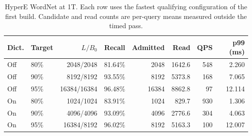 \begin{table}[htbp]
  \centering
  \caption{HyperE WordNet at 1T. Each row uses the fastest qualifying configuration of the first build. Candidate and read counts are per-query means measured outside the timed pass.}
  \label{tab:deep_budget}
  \footnotesize
  \setlength{\tabcolsep}{3pt}
  \begin{tabular}{@{}llrrrrrr@{}}
  \toprule
  Dict. & Target & $L/B_0$ & Recall & Admitted & Read & QPS & p99 (ms) \\
  \midrule
  Off & 80\% & 2048/2048 & 81.64\% & 2048 & 1642.6 & 548 & 2.260 \\
  Off & 90\% & 8192/8192 & 93.55\% & 8192 & 5373.8 & 168 & 7.065 \\
  Off & 95\% & 16384/16384 & 96.48\% & 16384 & 8862.8 & 97 & 12.114 \\
  \midrule
  On & 80\% & 1024/1024 & 83.91\% & 1024 & 829.7 & 930 & 1.306 \\
  On & 90\% & 4096/4096 & 93.09\% & 4096 & 2776.6 & 304 & 4.063 \\
  On & 95\% & 16384/8192 & 96.02\% & 8192 & 5163.3 & 100 & 12.007 \\
  \bottomrule
  \end{tabular}
\end{table}
